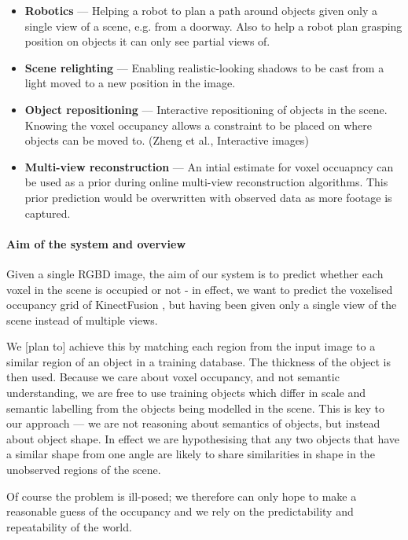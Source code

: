 \documentclass[10pt,twocolumn,letterpaper]{article}
\makeatletter
\newcommand*{\ea}{et al.\@\xspace}
\makeatother
\begin{document}
\begin{itemize}
\item \textbf{Robotics} --- Helping a robot to plan a path around objects given only a single view of a scene, e.g. from a doorway. Also to help a robot plan grasping position on objects it can only see partial views of.
\item \textbf{Scene relighting} --- Enabling realistic-looking shadows to be cast from a light moved to a new position in the image.
\item \textbf{Object repositioning} --- Interactive repositioning of objects in the scene. Knowing the voxel occupancy allows a constraint to be placed on where objects can be moved to. (\eg Zheng \ea, Interactive images)
\item \textbf{Multi-view reconstruction} --- An intial estimate for voxel occuapncy can be used as a prior during online multi-view reconstruction algorithms. This prior prediction would be overwritten with observed data as more footage is captured.
\end{itemize}

\paragraph{Aim of the system and overview}
Given a single RGBD image, the aim of our system is to predict whether each voxel in the scene is occupied or not - in effect, we want to predict the voxelised occupancy grid of KinectFusion \cite{izadi-uist-2011}, but having been given only a single view of the scene instead of multiple views.

We [plan to] achieve this by matching each region from the input image to a similar region of an object in a training database.
The thickness of the object is then used.
Because we care about voxel occupancy, and not semantic understanding, we are free to use training objects which differ in scale and semantic labelling from the objects being modelled in the scene. 
This is key to our approach --- we are not reasoning about semantics of objects, but instead about object shape.
In effect we are hypothesising that any two objects that have a similar shape from one angle are likely to share similarities in shape in the unobserved regions of the scene.

Of course the problem is ill-posed; we therefore can only hope to make a reasonable guess of the occupancy and we rely on the predictability and repeatability of the world.

\end{document}
